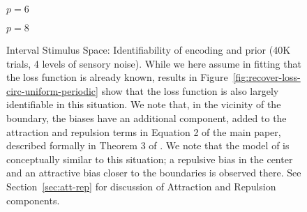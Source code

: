\begin{figure}
\begin{minipage}[b]{0.45\linewidth}
$p=6$




$p=8$




\end{minipage}




\caption{
Interval Stimulus Space: Identifiability of encoding and prior (40K trials, 4 levels of sensory noise). While we here assume in fitting that the loss function is already known, results in Figure~\ref{fig:recover-loss-circ-uniform-periodic} show that the loss function is also largely identifiable in this situation.
We note that, in the vicinity of the boundary, the biases have an additional component, added to the attraction and repulsion terms in Equation 2 of the main paper, described formally in Theorem 3 of \citet{hahn2024unifying}.
We note that the model of \citet{polania} is conceptually similar to this situation; a repulsive bias in the center and an attractive bias closer to the boundaries is observed there.
See Section~\ref{sec:att-rep} for discussion of Attraction and Repulsion components.
}\label{fig:fit-unimodal-unimodal}

\end{figure}



